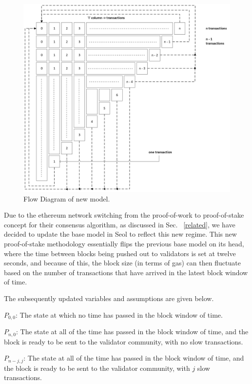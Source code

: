 \documentclass[conference]{IEEEtran}
\begin{document}
\begin{figure}[htbp]
    \centerline{\includegraphics[width=\textwidth]{Figures/FlowDiagram.png}}
    \caption{Flow Diagram of new model.} 
    \label{flow}
\end{figure}	

Due to the ethereum network switching from the proof-of-work to proof-of-stake 
concept for their consensus algorithm, as discussed in Sec. ~\ref{related}, we have decided to update
the base model in Seol\cite{2020_ACM_Seol} to reflect this new regime. This 
new proof-of-stake methodology essentially flips the previous base model on its 
head, where the time between blocks being pushed out to validators is set at twelve 
seconds, and because of this, the block size (in terms of gas) can then fluctuate based 
on the number of transactions that have arrived in the latest block window of time. 

The subsequently updated variables and assumptions are given below. 

$P_{0,0}$: The state at which no time has passed in the block window of time. 

$P_{n,0}$: The state at all of the time has passed in the block window of time, and
the block is ready to be sent to the validator community, with no slow transactions. 

$P_{n-j,j}$: The state at all of the time has passed in the block window of time, and
the block is ready to be sent to the validator community, with $j$ slow transactions. 
\end{document}
